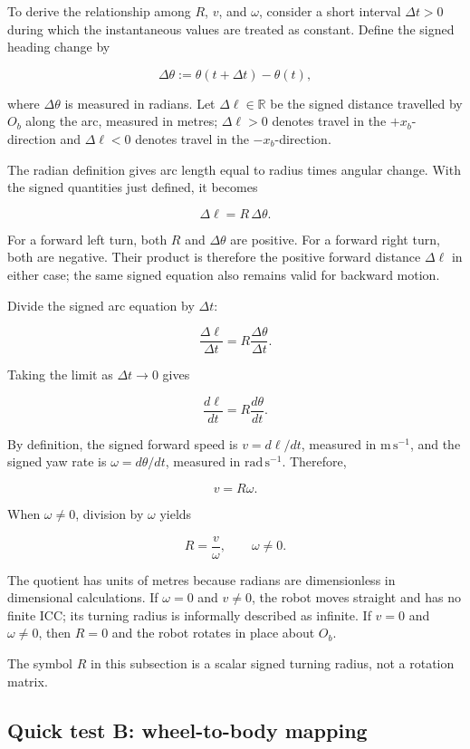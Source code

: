 \documentclass[
  australian,
  12pt,
  letterpaper,
  DIV=11,
  numbers=noendperiod,
  twoside]{scrreprt}
\begin{document}
To derive the relationship among \(R\), \(v\), and \(\omega\), consider
a short interval \(\Delta t>0\) during which the instantaneous values
are treated as constant. Define the signed heading change by

\[
\Delta\theta
\mathrel{:=}
\theta(t+\Delta t)-\theta(t),
\]

where \(\Delta\theta\) is measured in radians. Let
\(\Delta\ell\in\mathbb R\) be the signed distance travelled by \(O_b\)
along the arc, measured in metres; \(\Delta\ell>0\) denotes travel in
the \(+x_b\)-direction and \(\Delta\ell<0\) denotes travel in the
\(-x_b\)-direction.

The radian definition gives arc length equal to radius times angular
change. With the signed quantities just defined, it becomes

\[
\boxed{\Delta\ell=R\,\Delta\theta}.
\]

For a forward left turn, both \(R\) and \(\Delta\theta\) are positive.
For a forward right turn, both are negative. Their product is therefore
the positive forward distance \(\Delta\ell\) in either case; the same
signed equation also remains valid for backward motion.

Divide the signed arc equation by \(\Delta t\):

\[
\frac{\Delta\ell}{\Delta t}
=
R\frac{\Delta\theta}{\Delta t}.
\]

Taking the limit as \(\Delta t\to0\) gives

\[
\frac{d\ell}{dt}
=
R\frac{d\theta}{dt}.
\]

By definition, the signed forward speed is \(v=d\ell/dt\), measured in
\(\mathrm{m\,s^{-1}}\), and the signed yaw rate is
\(\omega=d\theta/dt\), measured in \(\mathrm{rad\,s^{-1}}\). Therefore,

\[
\boxed{v=R\omega}.
\]

When \(\omega\neq0\), division by \(\omega\) yields

\[
\boxed{
R=\frac{v}{\omega}
},
\qquad
\omega\neq0.
\]

The quotient has units of metres because radians are dimensionless in
dimensional calculations. If \(\omega=0\) and \(v\neq0\), the robot
moves straight and has no finite ICC; its turning radius is informally
described as infinite. If \(v=0\) and \(\omega\neq0\), then \(R=0\) and
the robot rotates in place about \(O_b\).

The symbol \(R\) in this subsection is a scalar signed turning radius,
not a rotation matrix.

\subsection*{Quick test B: wheel-to-body
mapping}\label{quick-test-b-wheel-to-body-mapping}
\end{document}
